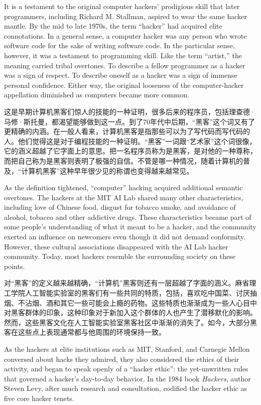 \ifdefined\eng
It is a testament to the original computer hackers' prodigious skill that later programmers, including Richard M. Stallman, aspired to wear the same hacker mantle. By the mid to late 1970s, the term ``hacker'' had acquired elite connotations. In a general sense, a computer hacker was any person who wrote software code for the sake of writing software code. In the particular sense, however, it was a testament to programming skill. Like the term ``artist,'' the meaning carried tribal overtones. To describe a fellow programmer as a hacker was a sign of respect. To describe oneself as a hacker was a sign of immense personal confidence. Either way, the original looseness of the computer-hacker appellation diminished as computers became more common.
\fi

\ifdefined\chs
这是早期计算机黑客们惊人的技能的一种证明，很多后来的程序员，包括理查德·马修·斯托曼，都渴望能够做到这一点。到了70年代中后期，“黑客”这个词又有了更精确的内涵。在一般人看来，计算机黑客是指那些可以为了写代码而写代码的人。他们觉得这是对于编程技能的一种证明。“黑客”一词跟“艺术家”这个词很像，它的涵义超越了它字面上的意思。把一名程序员称为是黑客，是对他的一种尊称，而把自己称为是黑客则表明了极强的自信。不管是哪一种情况，随着计算机的普及，“计算机黑客”这种早年很少见的称谓也变得越来越常见。
\fi

\ifdefined\eng
As the definition tightened, ``computer'' hacking acquired additional semantic overtones.  The hackers at the MIT AI Lab shared many other characteristics, including love of Chinese food, disgust for tobacco smoke, and avoidance of alcohol, tobacco and other addictive drugs.  These characteristics became part of some people's understanding of what it meant to be a hacker, and the community exerted an influence on newcomers even though it did not demand conformity.  However, these cultural associations disappeared with the AI Lab hacker community.  Today, most hackers resemble the surrounding society on these points.
\fi

\ifdefined\chs
对“黑客”的定义越来越精确，“计算机”黑客则还有一层超越了字面的涵义。麻省理工学院人工智能实验室的黑客们有一些共同的特质，包括，喜欢吃中国菜、讨厌抽烟、不沾烟、酒和其它一些可能会上瘾的药物。这些特质也渐渐成为一些人心目中对黑客群体的印象，这种印象对于新加入这个群体的人也产生了潜移默化的影响。然而，这些黑客文化在人工智能实验室黑客社区中渐渐的消失了。如今，大部分黑客在这些点上表现通常都与他周围的环境保持一致。
\fi

\ifdefined\eng
As the hackers at elite institutions such as MIT, Stanford, and Carnegie Mellon conversed about hacks they admired, they also considered the ethics of their activity, and began to speak openly of a ``hacker ethic'': the yet-unwritten rules that governed a hacker's day-to-day behavior. In the 1984 book \textit{Hackers}, author Steven Levy, after much research and consultation, codified the hacker ethic as five core hacker tenets.
\fi

